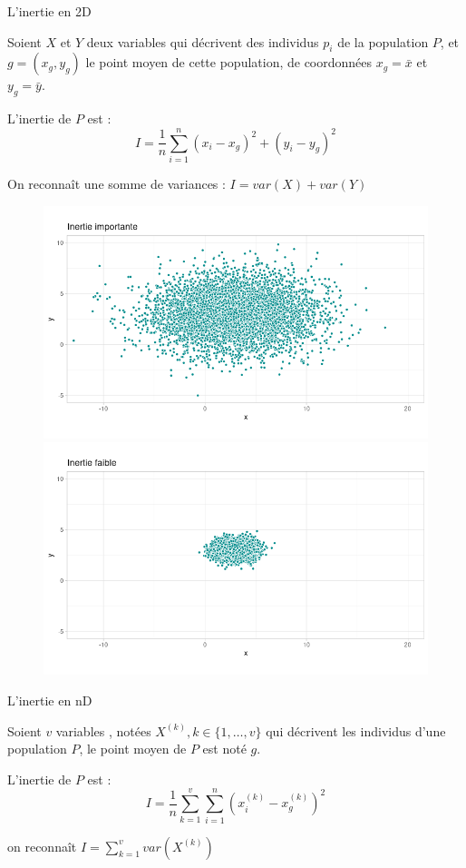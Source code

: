 \documentclass{beamer}
\begin{document}
\begin{frame}{L'inertie en 2D}


Soient $X$ et $Y$ deux variables qui décrivent des individus $p_i$ de la population $P$, et $g=(x_g,y_g)$ le point moyen de cette population, de coordonnées $x_g=\bar{x}$ et $y_g=\bar{y}$.


L'inertie de $P$ est :  $$I= \frac{1}{n}\sum_{i=1}^n (x_i-x_g)^2 + (y_i-y_g)^2$$

\begin{tiny}
On reconnaît une somme de variances : $I=var(X)+var(Y)$
\end{tiny}
\begin{figure}[!htb]
   \begin{minipage}{0.5\textwidth}
     \centering
     \includegraphics[width=.7\linewidth]{img/inertie_2D.png}
     
   \end{minipage}\hfill
   \begin{minipage}{0.5\textwidth}
     \centering
     \includegraphics[width=.7\linewidth]{img/inertie_2D_2.png}
     
   \end{minipage}
\end{figure}


\end{frame}


\begin{frame}{L'inertie en nD}

Soient  $v$ variables , notées $X^{(k)}, k \in \{1,\dots,v\}$ qui décrivent les individus d'une population $P$, le point moyen de $P$ est noté $g$.

L'inertie de $P$ est :  $$I= \frac{1}{n}\sum_{k=1}^v\sum_{i=1}^n (x_i^{(k)}-x^{(k)}_g)^2$$

\begin{tiny}
on reconnaît $I= \sum_{k=1}^v var(X^{(k)})$
\end{tiny}

\end{frame}
\end{document}
